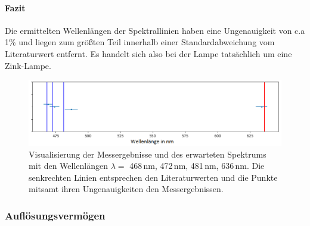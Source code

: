\documentclass[12pt,a4paper]{article}
\begin{document}
\paragraph{Fazit}
Die ermittelten Wellenlängen der Spektrallinien haben eine Ungenauigkeit von c.a 1\% und liegen zum größten Teil innerhalb einer Standardabweichung vom Literaturwert entfernt. Es handelt sich also bei der Lampe tatsächlich um eine Zink-Lampe.
\begin{figure}
\includegraphics[scale=0.8]{Bilder/Spektrum_Zink.png}
\caption{Visualisierung der Messergebnisse und des erwarteten Spektrums mit den Wellenlängen $\lambda =$ 468\,nm, 472\,nm, 481\,nm, 636\,nm. Die senkrechten Linien entsprechen den Literaturwerten und die Punkte mitsamt ihren Ungenauigkeiten den Messergebnissen.}
\label{fig:Spektrum_Zink}
\end{figure}
\subsubsection{Auflösungsvermögen}
\end{document}
